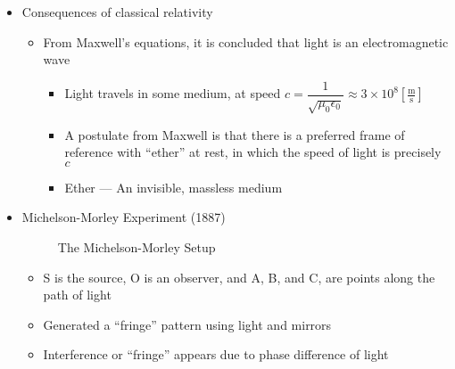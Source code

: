 \begin{itemize}
\begin{itemize}
\begin{itemize}
        \end{itemize}

    \end{itemize}

  \item Consequences of classical relativity

    \begin{itemize}

      \item From Maxwell's equations, it is concluded that light is an electromagnetic wave

        \begin{itemize}

          \item Light travels in some medium, at speed $\boxed{c=\dfrac{1}{\sqrt{\mu_0\epsilon_0}}}\approx3\times10^8\left[\frac{\si{\meter}}{\si{\second}}\right]$

          \item A postulate from Maxwell is that there is a preferred frame of reference with ``ether'' at rest, in which the speed of light is precisely $c$

          \item Ether — An invisible, massless medium

        \end{itemize}

    \end{itemize}

  \item Michelson-Morley Experiment (1887)

    \begin{figure}[h!]
      \centering
      
      \caption{The Michelson-Morley Setup}
      \label{fig:1}
    \end{figure}

    \begin{itemize}

      \item S is the source, O is an observer, and A, B, and C, are points along the path of light

      \item Generated a ``fringe'' pattern using light and mirrors

      \item Interference or ``fringe'' appears due to phase difference of light

        \begin{itemize}


\end{itemize}
\end{itemize}
\end{itemize}
